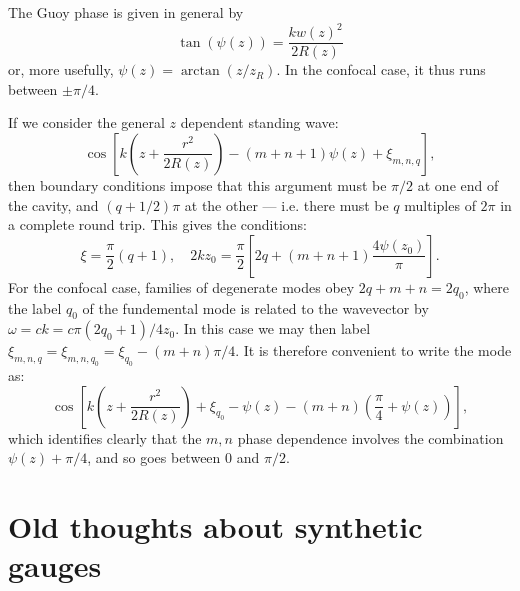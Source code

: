 \documentclass[twocolumn]{revtex4-1}
\begin{document}
The Guoy phase is given in general by 
\begin{displaymath}
  \tan(\psi(z)) = \frac{k w(z)^2}{2R(z)}
\end{displaymath}
or, more usefully, $\psi(z) = \arctan(z/z_R)$.  In the confocal
case, it thus runs between $\pm \pi/4$.

If we consider the general $z$ dependent standing wave:
\begin{displaymath}
  \cos\left[ k \left( z + \frac{r^2}{2R(z)} \right)
    - (m+n+1) \psi(z) + \xi_{m,n,q} \right],
\end{displaymath}
then boundary conditions impose that this argument must be $\pi/2$ at
one end of the cavity, and $(q+1/2) \pi$ at the other --- i.e. there
must be $q$ multiples of $2\pi$ in a complete round trip.  This gives
the conditions:
\begin{displaymath}
  \xi = \frac{\pi}{2}(q+1), \quad
  2kz_0 = \frac{\pi}{2} \left[ 2q + (m+n+1) \frac{4\psi(z_0)}{\pi} \right].
\end{displaymath}
For the confocal case, families of degenerate modes obey
$2q + m + n = 2 q_0$, where the label $q_0$ of the fundemental
mode is related to the wavevector by
$\omega = c k = c\pi (2q_0 +1) / 4 z_0$.  In this case we may then label
$\xi_{m,n,q} = \xi_{m,n,q_0} = \xi_{q_0} - (m+n)\pi/4$.  It is therefore
convenient to write the mode as:
\begin{displaymath}
  \cos\left[ k \left( z + \frac{r^2}{2R(z)} \right)
    + \xi_{q_0} - \psi(z)
    - (m+n) \left( \frac{\pi}{4} + \psi(z) \right)
  \right],
\end{displaymath}
which identifies clearly that the $m,n$ phase dependence involves the
combination $\psi(z) + \pi/4$, and so goes between $0$ and $\pi/2$.



\section{Old thoughts about synthetic gauges}
\end{document}
